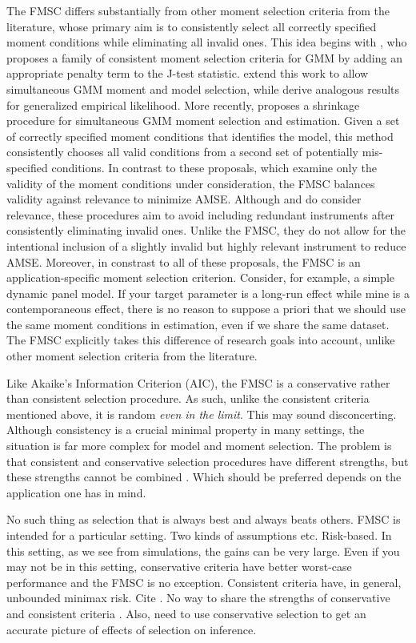 The FMSC differs substantially from other moment selection criteria from the literature, whose primary aim is to consistently select all correctly specified moment conditions while eliminating all invalid ones.
This idea begins with \cite{Andrews1999}, who proposes a family of consistent moment selection criteria for GMM by adding an appropriate penalty term to the J-test statistic. 
\cite{AndrewsLu} extend this work to allow simultaneous GMM moment and model selection, while \cite{HongPrestonShum} derive analogous results for generalized empirical likelihood. 
More recently, \cite{Liao} proposes a shrinkage procedure for simultaneous GMM moment selection and estimation. 
Given a set of correctly specified moment conditions that identifies the model, this method consistently chooses all valid conditions from a second set of potentially mis-specified conditions.
In contrast to these proposals, which examine only the validity of the moment conditions under consideration, the FMSC balances validity against relevance to minimize AMSE.
Although \cite{HallPeixe2003} and \cite{ChengLiao} do consider relevance, these procedures aim to avoid including redundant instruments after consistently eliminating invalid ones.
Unlike the FMSC, they do not allow for the intentional inclusion of a slightly invalid but highly relevant instrument to reduce AMSE. 
Moreover, in constrast to all of these proposals, the FMSC is an application-specific moment selection criterion.
Consider, for example, a simple dynamic panel model. If your target parameter is a long-run effect while mine is a contemporaneous effect, there is no reason to suppose a priori that we should use the same moment conditions in estimation, even if we share the same dataset.
The FMSC explicitly takes this difference of research goals into account, unlike other moment selection criteria from the literature.

Like Akaike's Information Criterion (AIC), the FMSC is a conservative rather than consistent selection procedure.
As such, unlike the consistent criteria mentioned above, it is random \emph{even in the limit}.
This may sound disconcerting.
Although consistency is a crucial minimal property in many settings, the situation is far more complex for model and moment selection.
The problem is that consistent and conservative selection procedures have different strengths, but these strengths cannot be combined \cite{Yang2005}.
Which should be preferred depends on the application one has in mind.


No such thing as selection that is always best and always beats others.
FMSC is intended for a particular setting.
Two kinds of assumptions etc.
Risk-based.
In this setting, as we see from simulations, the gains can be very large.
Even if you may not be in this setting, conservative criteria have better worst-case performance and the FMSC is no exception.
Consistent criteria have, in general, unbounded minimax risk.
Cite \cite{LeebPoetscher2008}.
No way to share the strengths of conservative and consistent criteria \cite{Yang2005}.
Also, need to use conservative selection to get an accurate picture of effects of selection on inference.


